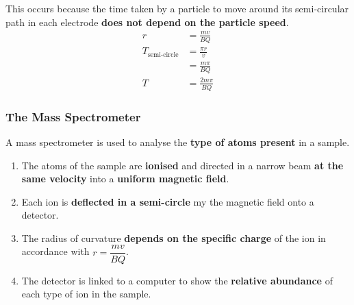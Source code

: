 This occurs because the time taken by a particle to move around its semi-circular path in each electrode \textbf{does not depend on the particle speed}.
\begin{align*}
    r&=\frac{mv}{BQ}\\
    T_\text{semi-circle}&=\frac{\pi r}{v}\\
                        &=\frac{m\pi}{BQ}\\
    T&=\frac{2m\pi}{BQ}
\end{align*}

\subsubsection*{The Mass Spectrometer}

A mass spectrometer is used to analyse the \textbf{type of atoms present} in a sample.
\begin{enumerate}
    \item The atoms of the sample are \textbf{ionised} and directed in a narrow beam \textbf{at the same velocity} into a \textbf{uniform magnetic field}.
    \item Each ion is \textbf{deflected in a semi-circle} my the magnetic field onto a detector.
    \item The radius of curvature \textbf{depends on the specific charge} of the ion in accordance with $r=\dfrac{mv}{BQ}$.
    \item The detector is linked to a computer to show the \textbf{relative abundance} of each type of ion in the sample.
\end{enumerate}

